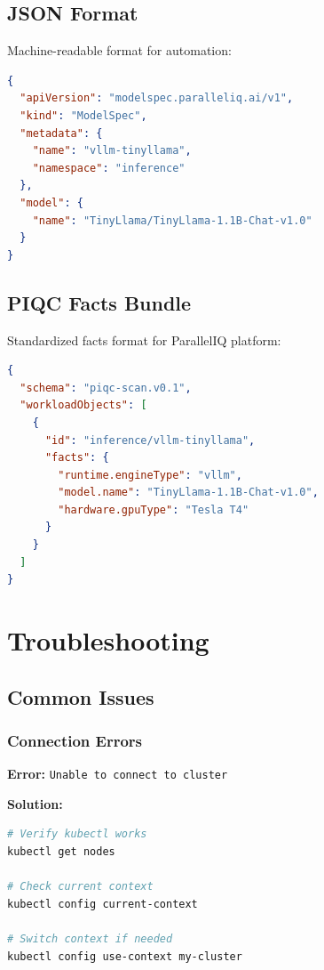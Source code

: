 \documentclass[11pt,a4paper]{article}
\begin{document}
\subsection{JSON Format}

Machine-readable format for automation:

\begin{lstlisting}[language=json,basicstyle=\ttfamily\scriptsize]
{
  "apiVersion": "modelspec.paralleliq.ai/v1",
  "kind": "ModelSpec",
  "metadata": {
    "name": "vllm-tinyllama",
    "namespace": "inference"
  },
  "model": {
    "name": "TinyLlama/TinyLlama-1.1B-Chat-v1.0"
  }
}
\end{lstlisting}

\subsection{PIQC Facts Bundle}

Standardized facts format for ParallelIQ platform:

\begin{lstlisting}[language=json,basicstyle=\ttfamily\scriptsize]
{
  "schema": "piqc-scan.v0.1",
  "workloadObjects": [
    {
      "id": "inference/vllm-tinyllama",
      "facts": {
        "runtime.engineType": "vllm",
        "model.name": "TinyLlama-1.1B-Chat-v1.0",
        "hardware.gpuType": "Tesla T4"
      }
    }
  ]
}
\end{lstlisting}

\section{Troubleshooting}

\subsection{Common Issues}

\subsubsection{Connection Errors}

\textbf{Error:} \texttt{Unable to connect to cluster}

\textbf{Solution:}
\begin{lstlisting}[language=bash]
# Verify kubectl works
kubectl get nodes

# Check current context
kubectl config current-context

# Switch context if needed
kubectl config use-context my-cluster
\end{lstlisting}
\end{document}
